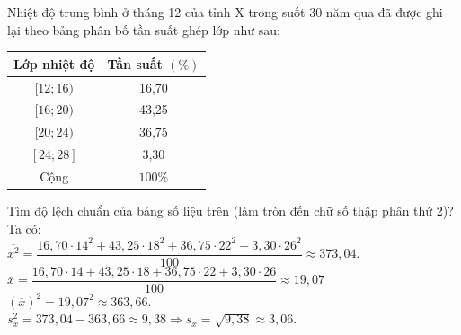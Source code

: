 \begin{ex}%
Nhiệt độ trung bình ở tháng 12 của tỉnh X trong suốt 30 năm qua đã được ghi lại theo bảng phân bố tần suất ghép lớp như sau:
\begin{center} 
	\begin{tabular}{|c|c|}\hline
		{Lớp nhiệt độ}&{Tần suất $(\%)$}\\
		\hline
		{$[12;16)$}&{16,70}\\
		\hline
		{$[16;20)$}&{43,25}\\
		\hline
		{$[20;24)$}&{36,75}\\
		\hline
		{$[24;28]$}&{3,30}\\
		\hline
		{Cộng}&{$100\%$}\\
		\hline
	\end{tabular}
\end{center}
Tìm độ lệch chuẩn của bảng số liệu trên (làm tròn đến chữ số thập phân thứ 2)?
\loigiai
{Ta có:\\
	$\overline{x^2}=\dfrac{16{,}70\cdot 14^2+43{,}25\cdot 18^2+36{,}75\cdot 22^2+3{,}30\cdot 26^2}{100}\approx373{,}04$.\\
	$\overline{x}=\dfrac{16{,}70\cdot 14+43{,}25\cdot 18+36{,}75\cdot 22+3{,}30\cdot 26}{100}\approx19{,}07$\\
	$(\overline{x})^2=19{,}07^2\approx363{,}66$.\\
	$s_x^2=373{,}04-363{,}66\approx9{,}38 \Rightarrow s_x=\sqrt{9{,}38}\approx 3{,}06$.
}
\end{ex}

